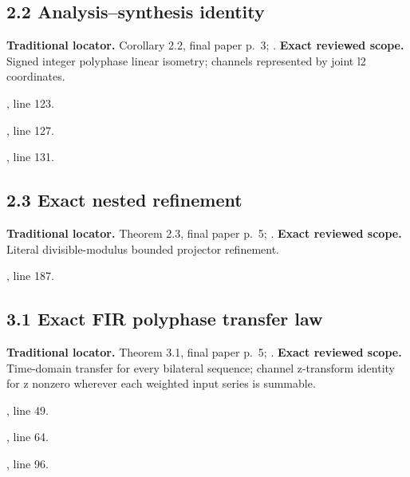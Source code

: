 \subsection{2.2 Analysis–synthesis identity}
\label{result:2.2}
\textbf{Traditional locator.} Corollary 2.2, final paper p.~3; .
\textbf{Exact reviewed scope.} Signed integer polyphase linear isometry; channels represented by joint l2 coordinates.
{\small{}\par}
{\footnotesize\color{muted}, line 123.\par}\smallskip
{\small{}\par}
{\footnotesize\color{muted}, line 127.\par}\smallskip
{\small{}\par}
{\footnotesize\color{muted}, line 131.\par}\smallskip
{}
\subsection{2.3 Exact nested refinement}
\label{result:2.3}
\textbf{Traditional locator.} Theorem 2.3, final paper p.~5; .
\textbf{Exact reviewed scope.} Literal divisible-modulus bounded projector refinement.
{\small{}\par}
{\footnotesize\color{muted}, line 187.\par}\smallskip
{}
\subsection{3.1 Exact FIR polyphase transfer law}
\label{result:3.1}
\textbf{Traditional locator.} Theorem 3.1, final paper p.~5; .
\textbf{Exact reviewed scope.} Time-domain transfer for every bilateral sequence; channel z-transform identity for z nonzero wherever each weighted input series is summable.
{\small{}\par}
{\footnotesize\color{muted}, line 49.\par}\smallskip
{\small{}\par}
{\footnotesize\color{muted}, line 64.\par}\smallskip
{\small{}\par}
{\footnotesize\color{muted}, line 96.\par}\smallskip
{}

